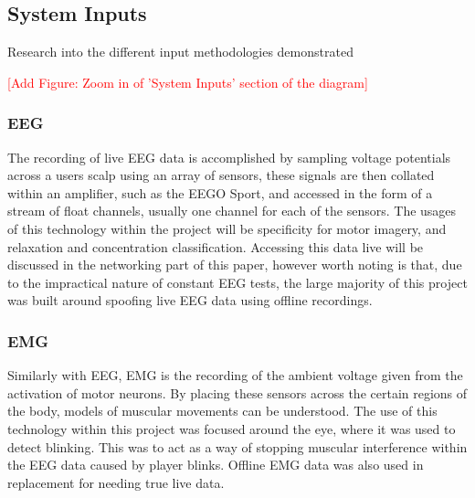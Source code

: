 \documentclass[11pt, a4paper]{article}
\newcommand{\addfigure}[1]
{\hfill 

\textcolor{red}{[Add Figure: #1]}

\hfill}
\begin{document}
\subsection{System Inputs}	
Research into the different input methodologies demonstrated 

\addfigure{Zoom in of 'System Inputs' section of the diagram}

\subsubsection{EEG}	
The recording of live EEG data is accomplished by sampling voltage potentials across a users scalp using an array of sensors, these signals are then collated within an amplifier, such as the EEGO Sport, and accessed in the form of a stream of float channels, usually one channel for each of the sensors. The usages of this technology within the project will be specificity for motor imagery, and relaxation and concentration classification. Accessing this data live will be discussed in the networking part of this paper, however worth noting is that, due to the impractical nature of constant EEG tests, the large majority of this project was built around spoofing live EEG data using offline recordings.


\subsubsection{EMG}	
Similarly with EEG, EMG is the recording of the ambient voltage given from the activation of motor neurons. By placing these sensors across the certain regions of the body, models of muscular movements can be understood. The use of this technology within this project was focused around the eye, where it was used to detect blinking. This was to act as a way of stopping muscular interference within the EEG data caused by player blinks. Offline EMG data was also used in replacement for needing true live data.
\end{document}

